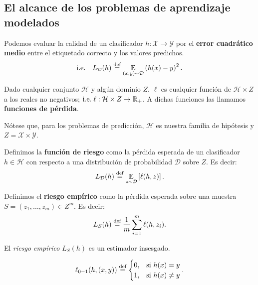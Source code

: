\documentclass[8pt,a4paper]{extarticle}
\begin{document}
\begin{multicols}{3}
	\subsection{El alcance de los problemas de aprendizaje modelados}

	\begin{boxrmk}
		Podemos evaluar la calidad de un clasificador $h : \mathcal{X} \to \mathcal{Y}$ por el \textbf{error cuadrático medio} entre el etiquetado correcto y los valores predichos.
		\[
			\text{\normalfont i.e.} \quad L_{\mathcal{D}}(h) \stackrel{\text{\normalfont def}}{=} \underset{(x,y)\sim \mathcal{D}}{\mathbb{E}} \left( h(x) - y \right)^2
			.\]
	\end{boxrmk}

	\begin{boxdef}
		Dado cualquier conjunto $\mathcal{H}$ y algún dominio $Z$. $ \ell$ es cualquier función de $\mathcal{H} \times Z$ a los reales no negativos; $\text{\normalfont i.e.}\; \ell: \mathcal{H} \times Z \to \mathbb{R}_{+}$. A dichas funciones las llamamos \textbf{funciones de pérdida}. \par
		Nótese que, para los problemas de predicción, $\mathcal{H}$ es nuestra familia de hipótesis y $Z = \mathcal{X} \times \mathcal{Y}$.
	\end{boxdef}

	\begin{boxdef}
		Definimos la \textbf{función de riesgo} como la pérdida esperada de un clasificador $h \in \mathcal{H}$ con respecto a una distribución de probabilidad $\mathcal{D}$ sobre $Z$. Es decir:
		\[
			L_{\mathcal{D}} (h) \stackrel{\text{\normalfont def}}{=} \underset{z\sim \mathcal{D}}{\mathbb{E}} \left[ \ell (h,z) \right]
			.\]
	\end{boxdef}

	\begin{boxdef}
		Definimos el \textbf{riesgo empírico} como la pérdida esperada sobre una muestra $S = \left( z_1, \ldots, z_m \right) \in Z^m$. Es decir:
		\[
			L_S (h) \stackrel{\text{\normalfont def}}{=} \frac{1}{m} \sum_{i = 1}^{m} \ell (h, z_i)
			.\]
	\end{boxdef}

	\begin{boxprop}[]
		El \emph{riesgo empírico} $L_S (h)$ es un estimador insesgado.
	\end{boxprop}

	\begin{boxdef}[Pérdida 0-1]
		\[
			\ell_{0-1} (h, (x,y)) \stackrel{\text{\normalfont def}}{=} \begin{cases}
				0, & \text{\normalfont si } h(x) = y    \\
				1, & \text{\normalfont si } h(x) \neq y
			\end{cases}
			.\]
	\end{boxdef}


\end{multicols}
\end{document}
